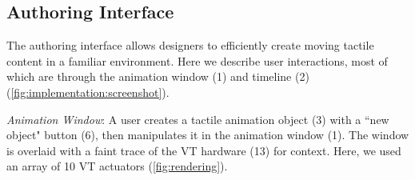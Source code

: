 

%
%
\subsection{Authoring Interface}
The authoring interface %
allows designers to efficiently create moving tactile content in a familiar environment.
Here we describe user interactions, %
most of which
are through the animation window (1) and  timeline (2) (\autoref{fig:implementation:screenshot}).
%

\emph{Animation Window}: A user creates a tactile animation object (3) with a ``new object" button (6), then manipulates it in the animation window (1). %
The window is overlaid with a faint trace of the %
VT hardware (13) for %
context. %
Here, we used an array of 10 VT actuators (\autoref{fig:rendering}).


